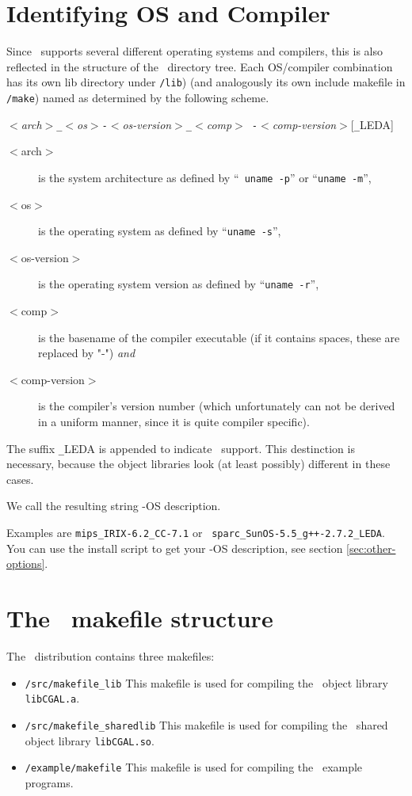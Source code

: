 \section{Identifying OS and Compiler}\label{sec:os-compiler-id}

Since \cgal\ supports several different operating systems and
compilers, this is also reflected in the structure of the \cgal\ 
directory tree. Each OS/compiler combination has its own lib directory
under {\tt \cgaldir/lib}) (and analogously its own include makefile in
{\tt \cgaldir/make}) named as determined by the following scheme.
\begin{center}
  {\it $<$arch$>${\tt \_}$<$os$>${\tt -}$<$os-version$>${\tt \_}$<$comp$>${\tt
    -}$<$comp-version$>$}[{\tt \_}LEDA]
\end{center}

\begin{description}
\item[$<$arch$>$] is the system architecture as defined by ``{\tt
    uname -p}'' or ``{\tt uname -m}'',
\item[$<$os$>$] is the operating system as defined by ``{\tt uname
    -s}'',
\item[$<$os-version$>$] is the operating system version as defined by
  ``{\tt uname -r}'',
\item[$<$comp$>$] is the basename of the compiler executable (if it
  contains spaces, these are replaced by "-") {\it and}
\item[$<$comp-version$>$] is the compiler's version number (which
  unfortunately can not be derived in a uniform manner, since it is
  quite compiler specific).
\end{description}

The suffix {\tt \_}LEDA is appended to indicate \leda\ support. This
destinction is necessary, because the object libraries look (at least
possibly) different in these cases.

We call the resulting string \cgal-OS description. 

Examples are {\tt mips\_IRIX-6.2\_CC-7.1} or {\tt
  sparc\_SunOS-5.5\_g++-2.7.2\_LEDA}. You can use the install
script to get your \cgal-OS description, see section
\ref{sec:other-options}.

\section{The \cgal\ makefile structure \label{sec:makefiles}}

The \cgal\ distribution contains three makefiles:
\begin{itemize}
\item \texttt{\cgaldir/src/makefile\_lib} This makefile is used for
  compiling the \cgal\ object library {\tt libCGAL.a}.
  
\item \texttt{\cgaldir/src/makefile\_sharedlib} This makefile is used
  for compiling the \cgal\ shared object library {\tt libCGAL.so}.
  
\item \texttt{\cgaldir/example/makefile} This makefile is used for
  compiling the \cgal\ example programs.
\end{itemize}

